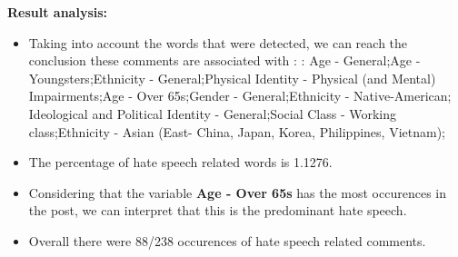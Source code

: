 \documentclass[11pt]{article}
\begin{document}
\textbf{\Large Result analysis:}

\begin{itemize}\item Taking into account the words that were detected, we can reach the conclusion these comments are associated with : : Age - General;Age - Youngsters;Ethnicity - General;Physical Identity - Physical (and Mental) Impairments;Age - Over 65s;Gender - General;Ethnicity - Native-American; Ideological and Political Identity - General;Social Class - Working class;Ethnicity - Asian (East- China, Japan, Korea, Philippines, Vietnam);%

\item The percentage of hate speech related words is 1.1276.

\item Considering that the variable \textbf{Age - Over 65s} has the most occurences in the post, we can interpret that this is the predominant hate speech.

\item Overall there were 88/238 occurences of hate speech related comments.\end{itemize}
\end{document}
